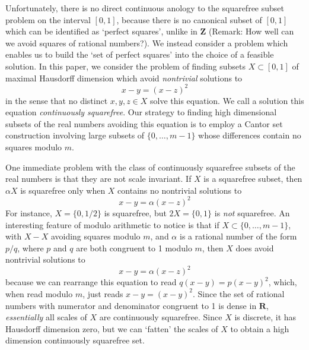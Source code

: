 \documentclass{article}
\theoremstyle{plain}
\theoremstyle{plain}
\begin{document}
Unfortunately, there is no direct continuous anology to the squarefree subset problem on the interval $[0,1]$, because there is no canonical subset of $[0,1]$ which can be identified as `perfect squares', unlike in $\mathbf{Z}$ (Remark: How well can we avoid squares of rational numbers?). We instead consider a problem which enables us to build the `set of perfect squares' into the choice of a feasible solution. In this paper, we consider the problem of finding subsets $X \subset [0,1]$ of maximal Hausdorff dimension which avoid {\it nontrivial} solutions to 
%
\begin{equation} \label{THE-Equation} x - y = (x-z)^2 \end{equation}
%
in the sense that no distinct $x,y,z \in X$ solve this equation. We call a solution this equation {\it continuously squarefree}. Our strategy to finding high dimensional subsets of the real numbers avoiding this equation is to employ a Cantor set construction involving large subsets of $\{ 0, \dots, m-1 \}$ whose differences contain no squares modulo $m$.

One immediate problem with the class of continuously squarefree subsets of the real numbers is that they are not scale invariant. If $X$ is a squarefree subset, then $\alpha X$ is squarefree only when $X$ contains no nontrivial solutions to
%
\[ x - y = \alpha (x - z)^2 \]
%
For instance, $X = \{ 0, 1/2 \}$ is squarefree, but $2X = \{ 0, 1 \}$ is {\it not} squarefree. An interesting feature of modulo arithmetic to notice is that if $X \subset \{ 0, \dots, m-1 \}$, with $X - X$ avoiding squares modulo $m$, and $\alpha$ is a rational number of the form $p/q$, where $p$ and $q$ are both congruent to 1 modulo $m$, then $X$ does avoid nontrivial solutions to
%
\[ x - y = \alpha (x - z)^2 \]
%
because we can rearrange this equation to read $q(x - y) = p(x-y)^2$, which, when read modulo $m$, just reads $x - y = (x - y)^2$. Since the set of rational numbers with numerator and denominator congruent to 1 is dense in $\mathbf{R}$, {\it essentially} all scales of $X$ are continuously squarefree. Since $X$ is discrete, it has Hausdorff dimension zero, but we can `fatten' the scales of $X$ to obtain a high dimension continuously squarefree set.
\end{document}

